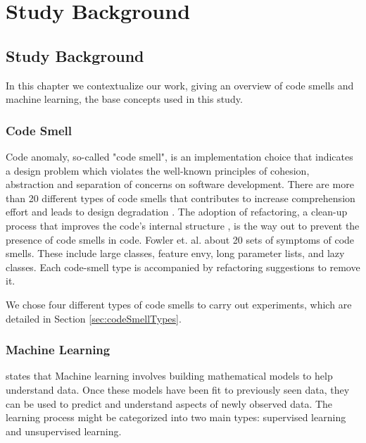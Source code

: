 \chapter{Study Background} 

\section{Study Background}  
\label{sec:background}

In this chapter we contextualize our work, giving an overview of code smells and machine learning, the base concepts used in this study.

\subsection{Code Smell}

Code anomaly, so-called "code smell", is an implementation choice that indicates a design problem which violates the well-known principles of cohesion, abstraction and separation of concerns \cite{oizumi2016code} on software development. There are more than 20 \cite{fowler1999refactoring} different types of code smells that contributes to increase comprehension effort \cite{abbes2011empirical} and leads to design degradation \cite{oizumi2016code}. The adoption of refactoring, a clean-up process that improves the code's internal structure \cite{fowler1999refactoring}, is the way out to prevent the presence of code smells in code. Fowler et. al. \cite{fowler1999refactoring} about 20 sets of symptoms of code smells. These include large classes, feature envy, long parameter lists, and lazy classes. Each code-smell type is accompanied by refactoring suggestions to remove it.

We chose four different types of code smells to carry out experiments, which are detailed in Section \ref{sec:codeSmellTypes}.


\subsection{Machine Learning}
\cite{vanderplas2016python} states that Machine learning involves building mathematical models to help
understand data. Once these models have been fit to previously
seen data, they can be used to predict and understand aspects of newly observed data. The learning process might be categorized into two main types: supervised learning and unsupervised learning. 

